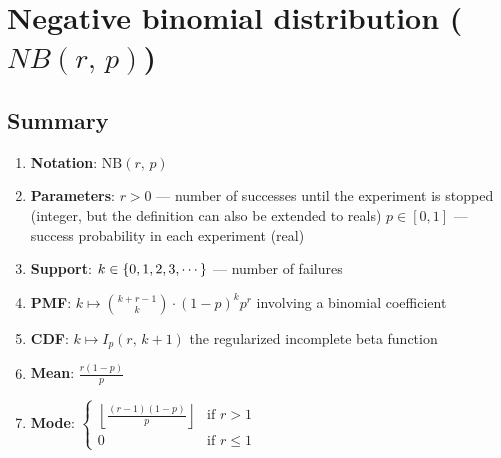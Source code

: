 \section{Negative binomial distribution ($ {\displaystyle  {NB} (r,\,p)}$)}







\subsection{Summary}

\begin{enumerate}
    \item \textbf{Notation}: 
    $
         {\displaystyle \mathrm {NB} (r,\,p)}
    $
    \hfill \cite{wiki/Negative_binomial_distribution}

    \item \textbf{Parameters}:
    $r > 0$ — number of successes until the experiment is stopped (integer, but the definition can also be extended to reals) $p \in [0, 1]$ — success probability in each experiment (real)
    \hfill \cite{wiki/Negative_binomial_distribution}

    \item \textbf{Support}: 
     $k \in \left\{0, 1, 2, 3, \cdots\right\}$ — number of failures
    \hfill \cite{wiki/Negative_binomial_distribution}

    \item \textbf{PMF}:
    ${\displaystyle k\mapsto {k+r-1 \choose k}\cdot (1-p)^{k}p^{r}}$ 
    involving a binomial coefficient
    \hfill \cite{wiki/Negative_binomial_distribution}

    \item \textbf{CDF}:
    ${\displaystyle k\mapsto I_{p}(r,\,k+1)}$ 
    the regularized incomplete beta function
    \hfill \cite{wiki/Negative_binomial_distribution}

    \item \textbf{Mean}: 
    $
         {\displaystyle {\frac {r(1-p)}{p}}}
    $
    \hfill \cite{wiki/Negative_binomial_distribution}


    \item \textbf{Mode}: 
    $
         {\displaystyle {\begin{cases}\left\lfloor {\frac {(r-1)(1-p)}{p}}\right\rfloor &{\text{if }}r>1\\0&{\text{if }}r\leq 1\end{cases}}}
    $
    \hfill \cite{wiki/Negative_binomial_distribution}


\end{enumerate}
